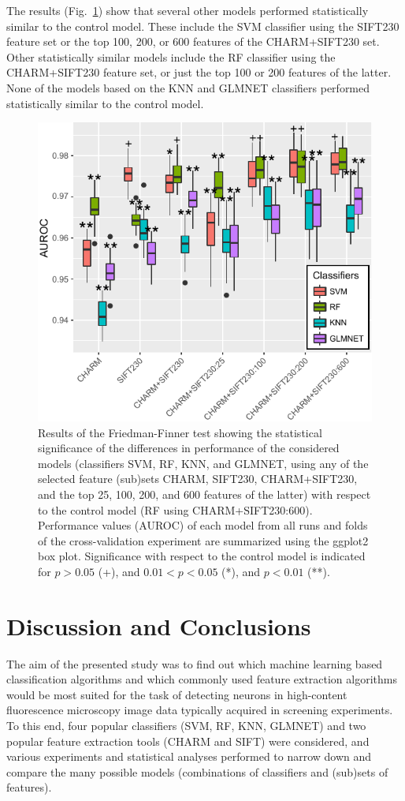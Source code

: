 The results (Fig.~\ref{fig:statisticalSignificance}) show that several other models performed statistically similar to the control model. These include the SVM classifier using the SIFT230 feature set or the top 100, 200, or 600 features of the CHARM+SIFT230 set. Other statistically similar models include the RF classifier using the CHARM+SIFT230 feature set, or just the top 100 or 200 features of the latter. None of the models based on the KNN and GLMNET classifiers performed statistically similar to the control model.
\begin{figure}[ht]
	\centering
	\includegraphics[width=0.8\columnwidth]{fig10}
	\caption{Results of the Friedman-Finner test showing the statistical significance of the differences in performance of the considered models (classifiers SVM, RF, KNN, and GLMNET, using any of the selected feature (sub)sets CHARM, SIFT230, CHARM+SIFT230, and the top 25, 100, 200, and 600 features of the latter) with respect to the control model (RF using CHARM+SIFT230:600). Performance values (AUROC) of each model from all runs and folds of the cross-validation experiment are summarized using the ggplot2 box plot. Significance with respect to the control model is indicated for $p > 0.05$ (+), and $0.01 < p < 0.05$ (*), and $p < 0.01$ (**).}
	\label{fig:statisticalSignificance}
\end{figure}
\section{Discussion and Conclusions}
\label{sec:discussion}
The aim of the presented study was to find out which machine learning based classification algorithms and which commonly used feature extraction algorithms would be most suited for the task of detecting neurons in high-content fluorescence microscopy image data typically acquired in screening experiments. To this end, four popular classifiers (SVM, RF, KNN, GLMNET) and two popular feature extraction tools (CHARM and SIFT) were considered, and various experiments and statistical analyses performed to narrow down and compare the many possible models (combinations of classifiers and (sub)sets of features).

